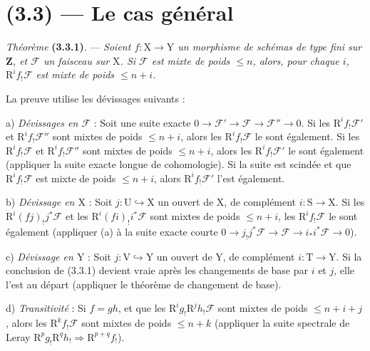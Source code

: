 \documentclass[11pt,leqno]{article}
\begin{document}
\section*{(3.3) — Le cas général}

\textit{Théorème} \textbf{(3.3.1)}. — \textit{Soient \(f:\mathrm{X}\to\mathrm{Y}\) un morphisme de schémas de type fini sur \(\mathbf{Z}\), et \(\mathscr{F}\) un faisceau sur \(\mathrm{X}\). Si \(\mathscr{F}\) est mixte de poids \(\leq n\), alors, pour chaque \(i\), \(\mathrm{R}^if_!\mathscr{F}\) est mixte de poids \(\leq n+i\).}

La preuve utilise les dévissages suivants :

a) \textit{Dévissages en \(\mathscr{F}\)} : Soit une suite exacte \(0\to\mathscr{F}'\to\mathscr{F}\to\mathscr{F}''\to0\). Si les \(\mathrm{R}^if_!\mathscr{F}'\) et \(\mathrm{R}^if_!\mathscr{F}''\) sont mixtes de poids \(\leq n+i\), alors les \(\mathrm{R}^if_!\mathscr{F}\) le sont également. Si les \(\mathrm{R}^if_!\mathscr{F}\) et \(\mathrm{R}^if_!\mathscr{F}''\) sont mixtes de poids \(\leq n+i\), alors les \(\mathrm{R}^if_!\mathscr{F}'\) le sont également (appliquer la suite exacte longue de cohomologie). Si la suite est scindée et que \(\mathrm{R}^if_!\mathscr{F}\) est mixte de poids \(\leq n+i\), alors \(\mathrm{R}^if_!\mathscr{F}'\) l’est également.

b) \textit{Dévissage en \(\mathrm{X}\)} : Soit \(j:\mathrm{U}\hookrightarrow\mathrm{X}\) un ouvert de \(\mathrm{X}\), de complément \(i:\mathrm{S}\to\mathrm{X}\). Si les \(\mathrm{R}^i(fj)_!j^*\mathscr{F}\) et les \(\mathrm{R}^i(fi)_!i^*\mathscr{F}\) sont mixtes de poids \(\leq n+i\), les \(\mathrm{R}^if_!\mathscr{F}\) le sont également (appliquer (a) à la suite exacte courte \(0\to j_!j^*\mathscr{F}\to\mathscr{F}\to i_*i^*\mathscr{F}\to0\)).

c) \textit{Dévissage en \(\mathrm{Y}\)} : Soit \(j:\mathrm{V}\hookrightarrow\mathrm{Y}\) un ouvert de \(\mathrm{Y}\), de complément \(i:\mathrm{T}\to\mathrm{Y}\). Si la conclusion de (3.3.1) devient vraie après les changements de base par \(i\) et \(j\), elle l’est au départ (appliquer le théorème de changement de base).

d) \textit{Transitivité} : Si \(f=gh\), et que les \(\mathrm{R}^ig_!\mathrm{R}^jh_!\mathscr{F}\) sont mixtes de poids \(\leq n+i+j\), alors les \(\mathrm{R}^kf_!\mathscr{F}\) sont mixtes de poids \(\leq n+k\) (appliquer la suite spectrale de Leray \(\mathrm{R}^pg_!\mathrm{R}^qh_!\Rightarrow\mathrm{R}^{p+q}f_!\)).
\end{document}
